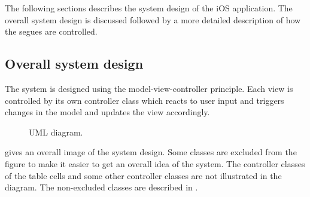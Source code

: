 The following sections describes the system design of the iOS application. The overall system design is discussed followed by a more detailed description of how the segues are controlled.

\subsection{Overall system design}
The  system is designed using the model-view-controller principle. Each view is controlled by its own controller class which reacts to user input and triggers changes in the model and updates the view accordingly.
\begin{figure}[ht]
\caption{UML diagram.}
\label{fig:ios_UML}
\end{figure}
\FloatBarrier

 gives an overall image of the system design. Some classes are excluded from the figure to make it easier to get an overall idea of the system. The controller classes of the table cells and some other controller classes are not illustrated in the diagram. The non-excluded classes are described in .


